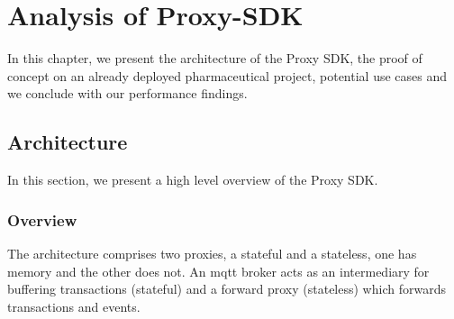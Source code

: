 \chapter{Analysis of Proxy-SDK}
In this chapter, we present the architecture of the Proxy SDK, the proof of concept on an already deployed pharmaceutical project, potential use cases and we conclude with our performance findings.
\section{Architecture}
In this section, we present a high level overview of the Proxy SDK.
\subsection{Overview}
The architecture comprises two proxies, a stateful and a stateless, one has memory and the other does not. An \acrshort{mqtt} broker acts as an intermediary for buffering transactions (stateful) and a forward proxy (stateless) which forwards transactions and events.

